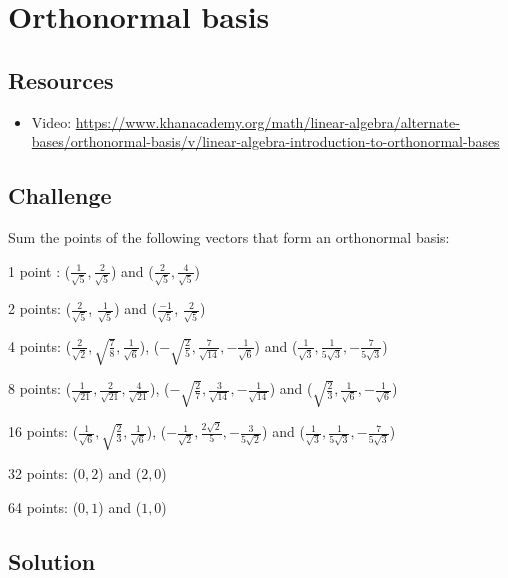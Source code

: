 \section{Orthonormal basis}

\subsection*{Resources}
\begin{itemize}
    \item Video: \url{https://www.khanacademy.org/math/linear-algebra/alternate-bases/orthonormal-basis/v/linear-algebra-introduction-to-orthonormal-bases}
\end{itemize}

\subsection*{Challenge}
Sum the points of the following vectors that form an orthonormal basis:

1 point :
($\displaystyle \frac{1}{\sqrt{5}}, \frac{2}{\sqrt{5}}$) and
($\displaystyle \frac{2}{\sqrt{5}}, \frac{4}{\sqrt{5}}$)

2 points:
($\displaystyle \frac{2}{\sqrt{5}}$, $\displaystyle \frac{1}{\sqrt{5}}$) and
($\displaystyle \frac{-1}{\sqrt{5}}$, $\displaystyle \frac{2}{\sqrt{5}}$)

4 points:
($\displaystyle \frac{2}{\sqrt{2}}, \sqrt{\frac{7}{8}}, \frac{1}{\sqrt{6}}$),
($\displaystyle -\sqrt{\frac{2}{5}}, \frac{7}{\sqrt{14}}, -\frac{1}{\sqrt{6}}$) and
($\displaystyle \frac{1}{\sqrt{3}},  \frac{1}{5 \sqrt{3}}, -\frac{7}{5 \sqrt{3}}$)

8 points:
($\displaystyle \frac{1}{\sqrt{21}}, \frac{2}{\sqrt{21}}, \frac{4}{\sqrt{21}}$),
($\displaystyle -\sqrt{\frac{2}{7}}, \frac{3}{\sqrt{14}}, -\frac{1}{\sqrt{14}}$) and
($\displaystyle \sqrt{\frac{2}{3}},  \frac{1}{\sqrt{6}}, -\frac{1}{\sqrt{6}}$)

16 points:
($\displaystyle \frac{1}{\sqrt{6}}, \sqrt{\frac{2}{3}}, \frac{1}{\sqrt{6}}$),
($\displaystyle -\frac{1}{\sqrt{2}},  \frac{2 \sqrt{2}}{5}, -\frac{3}{5 \sqrt{2}}$) and
($\displaystyle \frac{1}{\sqrt{3}},  \frac{1}{5 \sqrt{3}}, -\frac{7}{5 \sqrt{3}}$)

32 points:
($0, 2$) and ($2, 0$)

64 points:
($0, 1$) and ($1, 0$)

\subsection*{Solution}




